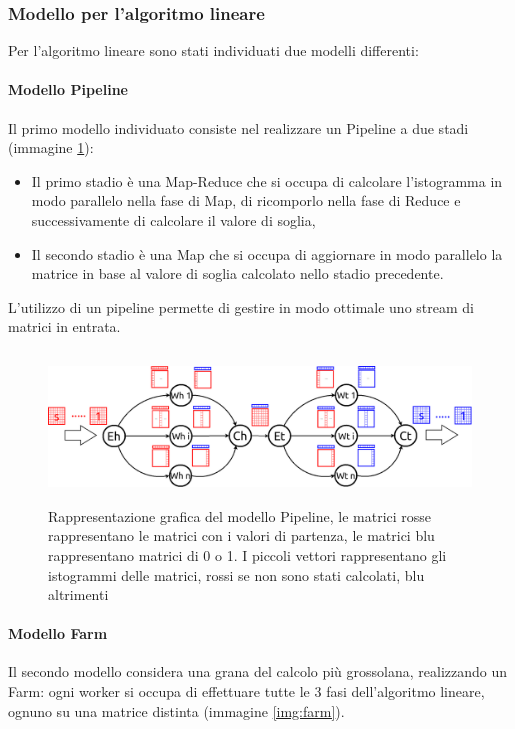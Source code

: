 \documentclass[a4paper,10pt]{article}
\begin{document}
\subsubsection{Modello per l'algoritmo lineare}

Per l'algoritmo lineare sono stati individuati due modelli differenti:

\paragraph{Modello \textsf{Pipeline}}
Il primo modello individuato consiste nel realizzare un \textsf{Pipeline} a due stadi (immagine \ref{img:pipeline}):

\begin{itemize}
\item Il primo stadio \`e una \textsf{Map-Reduce} che si occupa di calcolare l'istogramma in modo parallelo nella fase di {Map}, di ricomporlo nella fase di {Reduce} e successivamente di calcolare il valore di soglia,
\item Il secondo stadio \`e una \textsf{Map} che si occupa di aggiornare in modo parallelo la matrice in base al valore di soglia calcolato nello stadio precedente.
\end{itemize}

L'utilizzo di un pipeline permette di gestire in modo ottimale uno stream di matrici in entrata.

\begin{figure}[ht]
\centering
\includegraphics[height=4cm]{pipeline.png}
\caption{Rappresentazione grafica del modello \textsf{Pipeline}, le matrici rosse rappresentano le matrici con i valori di partenza, le matrici blu rappresentano matrici di 0 o 1. I piccoli vettori rappresentano gli istogrammi delle matrici, rossi se non sono stati calcolati, blu altrimenti}
\label{img:pipeline}
\end{figure}


\paragraph{Modello \textsf{Farm}}
Il secondo modello considera una grana del calcolo pi\`u grossolana, realizzando un \textsf{Farm}: ogni worker si occupa di effettuare tutte le 3 fasi dell'algoritmo lineare, ognuno su una matrice distinta (immagine \ref{img:farm}).
\end{document}
